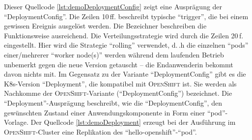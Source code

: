 

Dieser Quellcode \vref{lst:demoDeploymentConfig}\autocite[vgl.][Application\,$\rightarrow$\,Deployments]{red_hat_inc_okd_2019} zeigt eine Ausprägung der \enquote{DeploymentConfig}. Die Zeilen 10\,ff. beschreibt typische \enquote{trigger}, die bei einem gewissen Ereignis ausgelöst werden. Die Bezeichner beschreiben die Funktionsweise ausreichend. Die Verteilungsstrategie wird durch die Zeilen 20\,f. eingestellt. Hier wird die Strategie \enquote{rolling} verwendet, d.\,.h die einzelnen \enquote{pods} einer/mehrerer \enquote{worker node(s)} werden während dem laufenden Betrieb unbemerkt gegen die neue Version getauscht -- die Endanwenderin bekommt davon nichts mit. Im Gegensatz zu der Variante \enquote{DeploymentConfig} gibt es die \acl{K8s}-Version \enquote{Deployment}, die kompatibel mit \textsc{OpenShift} ist. Sie werden als Nachkomme der \textsc{OpenShift}-Variante (\enquote{DeploymentConfig})\autocite[vgl.][Application\,$\rightarrow$\,Deployments]{red_hat_inc_okd_2019} bezeichnet. Die \enquote{Deployment}-Ausprägung beschreibt, wie die \enquote{DeploymentConfig}, den gewünschten Zustand einer Anwendungskomponente in Form einer \enquote{pod}-Vorlage. Der Quellcode \vref{lst:demoDeployment}\autocite[vgl.][Application\,$\rightarrow$\,Deployments]{red_hat_inc_okd_2019} erzeugt bei der Ausführung im \textsc{OpenShift}-Cluster eine Replikation des \enquote{hello-openshift}-\enquote{pod}.




